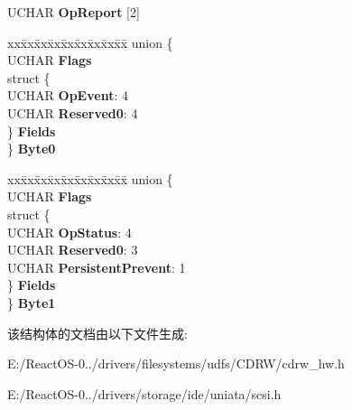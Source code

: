 \begin{DoxyCompactItemize}
\begin{tabbing}
\end{tabbing}\item 
\mbox{\label{struct___e_v_e_n_t___s_t_a_t___o_p_e_r_a_t_i_o_n_a_l___b_l_o_c_k_ad7789b6c436e26796efe3fdf3743be82}} 
U\+C\+H\+AR {\bfseries Op\+Report} \mbox{[}2\mbox{]}
\item 
\mbox{\label{struct___e_v_e_n_t___s_t_a_t___o_p_e_r_a_t_i_o_n_a_l___b_l_o_c_k_a8773ad899fbe3161e6ac80add05a6694}} 
\begin{tabbing}
xx\=xx\=xx\=xx\=xx\=xx\=xx\=xx\=xx\=\kill
union \{\\
\>UCHAR {\bfseries Flags}\\
\>struct \{\\
\>\>UCHAR {\bfseries OpEvent}: 4\\
\>\>UCHAR {\bfseries Reserved0}: 4\\
\>\} {\bfseries Fields}\\
\} {\bfseries Byte0}\\

\end{tabbing}\item 
\mbox{\label{struct___e_v_e_n_t___s_t_a_t___o_p_e_r_a_t_i_o_n_a_l___b_l_o_c_k_ac538add4bc322f838f719605228a755f}} 
\begin{tabbing}
xx\=xx\=xx\=xx\=xx\=xx\=xx\=xx\=xx\=\kill
union \{\\
\>UCHAR {\bfseries Flags}\\
\>struct \{\\
\>\>UCHAR {\bfseries OpStatus}: 4\\
\>\>UCHAR {\bfseries Reserved0}: 3\\
\>\>UCHAR {\bfseries PersistentPrevent}: 1\\
\>\} {\bfseries Fields}\\
\} {\bfseries Byte1}\\

\end{tabbing}\end{DoxyCompactItemize}


该结构体的文档由以下文件生成\+:\begin{DoxyCompactItemize}
\item 
E\+:/\+React\+O\+S-\/0../drivers/filesystems/udfs/\+C\+D\+R\+W/cdrw\+\_\+hw.\+h\item 
E\+:/\+React\+O\+S-\/0../drivers/storage/ide/uniata/scsi.\+h\end{DoxyCompactItemize}
